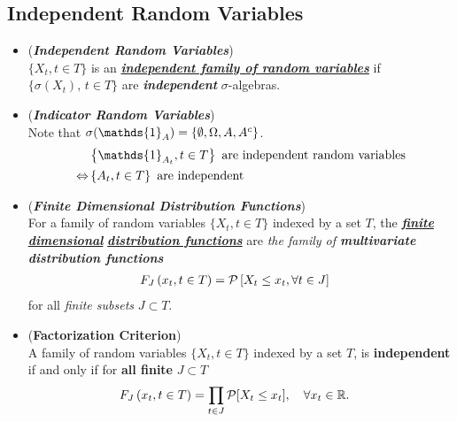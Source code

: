 \documentclass[11pt]{article}
\begin{document}
\subsection{Independent Random Variables}
\begin{itemize}
\item \begin{definition}(\emph{\textbf{Independent Random Variables}}) \\
$\{X_t, t \in T\}$ is an \underline{\emph{\textbf{independent family of random variables}}} if $\{\sigma(X_t),\, t \in T\}$ are \emph{\textbf{independent}} $\sigma$-algebras.
\end{definition}

\item \begin{remark} (\emph{\textbf{Indicator Random Variables}}) \\
Note that $\sigma(\mathds{1}_{A}) = \set{\emptyset, \Omega, A, A^c}$.
\begin{align*}
 &\set{\mathds{1}_{A_t}, t\in T} \text{ are independent random variables}\\
 \Leftrightarrow &\set{A_t, t\in T} \text{ are independent}
\end{align*}
\end{remark}

\item \begin{definition} (\emph{\textbf{Finite Dimensional Distribution Functions}})\\
For a family of random variables $\{X_t, t \in T\}$ indexed by a set $T$, the \underline{\emph{\textbf{finite dimensional}}} \underline{\emph{\textbf{distribution functions}}} are \emph{the family of \textbf{multivariate distribution functions}}
\begin{align*}
F_J\left(x_t, t \in T\right) &= {\mathcal P}\left[X_t \le x_t, \forall t\in J\right]
\end{align*}
for all \emph{finite subsets} $J \subset T$.
\end{definition}

\item \begin{proposition} (\textbf{Factorization Criterion})  \citep{resnick2013probability} \\
A family of random variables $\{X_t, t \in T\}$ indexed by a set $T$, is \textbf{independent} if and only if for \textbf{all finite} $J \subset T$
\begin{align*}
F_J\left(x_t, t \in T\right) &= \prod_{t \in J}{\mathcal P}[X_t \le x_t], \quad \forall x_t \in {\mathbb R}.
\end{align*}
\end{proposition}


\end{itemize}
\end{document}

